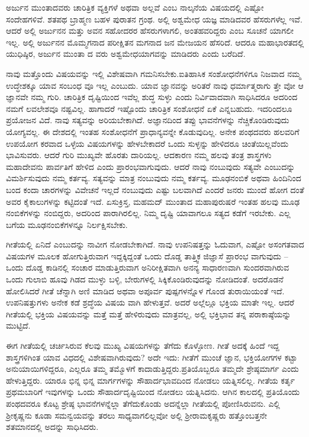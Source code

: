 ಅರ್ಜುನ ಮುಂತಾದವರು ಚಾರಿತ್ರಿಕ ವ್ಯಕ್ತಿಗಳೆ ಅಥವಾ ಅಲ್ಲವೆ ಎಂಬ ನಾಲ್ಕನೆಯ ವಿಷಯದಲ್ಲಿ ಎಷ್ಟೋ ಸಂದೇಹಗಳಿವೆ. ಶತಪಥ ಬ್ರಾಹ್ಮಣ ಬಹಳ ಪುರಾತನ ಗ್ರಂಥ. ಅಲ್ಲಿ ಅಶ್ವಮೇಧ ಯಜ್ಞ ಮಾಡಿದವರ ಹೆಸರುಗಳೆಲ್ಲ ಇವೆ. ಆದರೆ ಅಲ್ಲಿ ಅರ್ಜುನನ ಮತ್ತು ಅವನ ಸಹೋದರರ ಹೆಸರುಗಳಾಗಲಿ, ಅಂತಹವರಿದ್ದರು ಎಂಬ ಸೂಚನೆ ಯಾಗಲೀ ಇಲ್ಲ. ಅಲ್ಲಿ ಅರ್ಜುನನ ಮೊಮ್ಮಗನಾದ ಪರೀಕ್ಷಿತನ ಮಗನಾದ ಜನ ಮೇಜಯನ ಹೆಸರಿದೆ. ಆದರೂ ಮಹಾಭಾರತದಲ್ಲಿ ಯುಧಿಷ್ಠಿರ, ಅರ್ಜುನ ಮುಂತಾ ದ ವರು ಅಶ್ವಮೇಧಯಾಗವನ್ನು ಮಾಡಿದರು ಎಂದು ಬರೆದಿದೆ.

ನಾವು ಮತ್ತೊಂದು ವಿಷಯವನ್ನು ಇಲ್ಲಿ ವಿಶೇಷವಾಗಿ ಗಮನಿಸಬೇಕು.ಐತಿಹಾಸಿಕ ಸಂಶೋಧನೆಗಳಿಗೂ ನಿಜವಾದ ನಮ್ಮ ಉದ್ಧೇಶಕ್ಕೂ ಯಾವ ಸಂಬಂಧ ವೂ ಇಲ್ಲ ಎಂಬುದು. ಯಾವ ಜ್ಞಾನವನ್ನು ಅರಿತರೆ ನಾವು ಧರ್ಮಾತ್ಮರಾಗು ತ್ತೇ ವೋ ಆ ಜ್ಞಾನವೇ ನಮ್ಮ ಗುರಿ. ಚಾರಿತ್ರಿಕ ದೃಷ್ಟಿಯಿಂದ ಇವೆಲ್ಲ ಶುದ್ಧ ಸುಳ್ಳು ಎಂದು ನಿರ್ವಿವಾದವಾಗಿ ಸಾಧಿಸಿದರೂ ಅದರಿಂದ ನಮಗೆ ಲವಲೇಶವೂ ನಷ್ಟವಿಲ್ಲ. ಹಾಗಾದರೆ ಇಷ್ಟೊಂದು ಚಾರಿತ್ರಿಕ ಸಂಶೋಧನೆ ಏಕೆ ಎನ್ನಬಹುದು. ಇದರಿಂದಲೂ ಪ್ರಯೋಜನ ವಿದೆ. ನಾವು ಸತ್ಯವನ್ನು ಅರಿಯಬೇಕಾಗಿದೆ. ಅಜ್ಞಾನದಿಂದ ತಪ್ಪು ಭಾವನೆಗಳನ್ನು ನೆಚ್ಚಿಕೊಂಡಿರುವುದು ಯೋಗ್ಯವಲ್ಲ. ಈ ದೇಶದಲ್ಲಿ ಇಂತಹ ಸಂಶೋಧನೆಗೆ ಪ್ರಾಧಾನ್ಯವನ್ನೇ ಕೊಡುವುದಿಲ್ಲ. ಅನೇಕ ಪಂಥದವರು ಹಲವರಿಗೆ ಉಪಯೋಗ ಕರವಾದ ಒಳ್ಳೆಯ ವಿಷಯಗಳನ್ನು ಹೇಳಬೇಕಾದರೆ ಒಂದು ಸುಳ್ಳನ್ನು ಹೇಳಿದರೂ ಚಿಂತೆಯಿಲ್ಲವೆಂದು ಭಾವಿಸುವರು. ಆದರೆ ಗುರಿ ಮುಖ್ಯವೇ ಹೊರತು ದಾರಿಯಲ್ಲ. ಆದಕಾರಣ ನಮ್ಮ ಹಲವು ತಂತ್ರ ಶಾಸ್ತ್ರಗಳು ಮಹಾದೇವನು ಪಾರ್ವತಿಗೆ ಹೇಳಿದ ಎಂದು ಪ್ರಾರಂಭವಾಗುವುದು. ಆದರೆ ನಾವು ನಂಬುವುದು ಸತ್ಯವೇ ಎಂಬುದನ್ನು ವಿಮರ್ಶಿಸುವುದು ನಮ್ಮ ಕರ್ತವ್ಯ. ಸತ್ಯವನ್ನು ಮಾತ್ರ ನಂಬುವುದು ನಮ್ಮ ಕರ್ತವ್ಯ. ಮೂಢನಂಬಿಕೆ ಅಥವಾ ಹಿಂದಿನಿಂದ ಬಂದ ಕಂದಾ ಚಾರಗಳನ್ನು ವಿವೇಚನೆ ಇಲ್ಲದೆ ನಂಬುವುದು ಎಷ್ಟು ಬಲವಾಗಿದೆ ಎಂದರೆ ಜನರು ಮುಂದೆ ಹೋಗ ದಂತೆ ಅವರ ಕೈಕಾಲುಗಳನ್ನು ಕಟ್ಟಿದಂತೆ ಇದೆ. ಏಸುಕ್ರಿಸ್ತ, ಮಹಮದ್​ ಮುಂತಾದ ಮಹಾಪುರುಷರೆ ಇಂತಹ ಹಲವು ಮೂಢ ನಂಬಿಕೆಗಳನ್ನು ನಂಬಿದ್ದರು, ಅದರಿಂದ ಪಾರಾಗಿರಲಿಲ್ಲ. ನಿಮ್ಮ ದೃಷ್ಟಿ ಯಾವಾಗಲೂ ಸತ್ಯದ ಕಡೆಗೆ ಇರಬೇಕು. ಎಲ್ಲ ಬಗೆಯ ಮೂಢನಂಬಿಕೆಗಳನ್ನೂ ನಿರ್ಲಕ್ಷಿಸಬೇಕು.

ಗೀತೆಯಲ್ಲಿ ಏನಿದೆ ಎಂಬುದನ್ನು ನಾವೀಗ ನೋಡಬೇಕಾಗಿದೆ. ನಾವು ಉಪನಿಷತ್ತನ್ನು ಓದುವಾಗ, ಎಷ್ಟೋ ಅಸಂಗತವಾದ ವಿಷಯಗಳ ಮೂಲಕ ಹೋಗುತ್ತಿರುವಾಗ ಇದ್ದಕ್ಕಿದ್ದಂತೆ ಒಂದು ದೊಡ್ಡ ತಾತ್ತ್ವಿಕ ಜಿಜ್ಞಾಸೆ ಪ್ರಾರಂಭ ವಾಗುವುದು – ಒಂದು ದೊಡ್ಡ ಕಾಡಿನಲ್ಲಿ ಸಂಚಾರ ಮಾಡುತ್ತಿರುವಾಗ ಅನಿರೀಕ್ಷಿತವಾಗಿ ಅನನ್ಯ ಸಾಧಾರಣವಾಗಿ ಸುಂದರವಾಗಿರುವ ಒಂದು ಗುಲಾಬಿ ಹೂವು ಗಿಡದ ಮುಳ್ಳು ಬಳ್ಳಿ, ಬೇರುಗಳಲ್ಲಿ ಸಿಕ್ಕಿಕೊಂಡಿರುವುದನ್ನು ನೋಡಿದಂತೆ. ಅದರೊಡನೆ ಹೋಲಿಸಿದರೆ ಗೀತೆ ಚೆನ್ನಾಗಿ ಅಣಿ ಮಾಡಿದ ಅಥವಾ ಅಪೂರ್ವ ಪುಷ್ಪಗಳನ್ನೊಳ ಗೊಂಡ ತುರಾಯಿಯಂತೆ ಇದೆ. ಉಪನಿಷತ್ತುಗಳು ಅನೇಕ ಕಡೆ ಶ್ರದ್ಧೆಯ ವಿಷಯ ವಾಗಿ ಹೇಳುತ್ತವೆ. ಅದರೆ ಅಲ್ಲೆಲ್ಲೂ ಭಕ್ತಿಯ ಮಾತೇ ಇಲ್ಲ. ಆದರೆ ಗೀತೆಯಲ್ಲಿ ಭಕ್ತಿಯ ವಿಷಯವನ್ನು ಮತ್ತೆ ಮತ್ತೆ ಹೇಳಿರುವುದು ಮಾತ್ರವಲ್ಲ, ಅಲ್ಲಿ ಭಕ್ತಿಭಾವ ತನ್ನ ಪರಾಕಾಷ್ಠೆಯನ್ನು ಮುಟ್ಟಿದೆ.

ಈಗ ಗೀತೆಯಲ್ಲಿ ಚರ್ಚಿಸಿರುವ ಕೆಲವು ಮುಖ್ಯ ವಿಷಯಗಳನ್ನು ತೆಗೆದು ಕೊಳ್ಳೋಣ. ಗೀತೆ ಅದಕ್ಕೆ ಹಿಂದೆ ಇದ್ದ ಶಾಸ್ತ್ರಗಳಿಗಿಂತ ಯಾವ ವಿಧದಲ್ಲಿ ವಿಶೇಷವಾಗಿರುವುದು? ಅದೇ ಇದು: ಗೀತೆಗೆ ಮುಂಚೆ ಜ್ಞಾನ, ಭಕ್ತಿಯೋಗಗಳ ಕಟ್ಟಾ ಅನುಯಾಯಿಗಳಿದ್ದರೂ, ಎಲ್ಲರೂ ತಮ್ಮ ತಮ್ಮೊಳಗೆ ಕಾದಾಡುತ್ತಿದ್ದರು.ಪ್ರತಿಯೊಬ್ಬರೂ ತಮ್ಮದೇ ಶ್ರೇಷ್ಠಮಾರ್ಗ ಎಂದು ಹೇಳುತ್ತಿದ್ದರು. ಯಾರೂ ಭಿನ್ನ ಭಿನ್ನ ಮಾರ್ಗಗಳನ್ನು ಸೌಹಾರ್ದಭಾವದಿಂದ ನೋಡಲು ಯತ್ನಿಸಲಿಲ್ಲ. ಗೀತೆಯ ಕರ್ತೃ ಪ್ರಥಮಬಾರಿಗೆ ಇವುಗಳನ್ನು ಒಂದು ಸೌಹಾರ್ದದೃಷ್ಟಿಯಿಂದ ನೋಡಲು ಯತ್ನಿಸಿದನು. ಆಗಿನ ಕಾಲದಲ್ಲಿ ಪ್ರತಿಯೊಂದು ಪಂಥದವರೂ ಕೊಟ್ಟ ಶ್ರೇಷ್ಠ ಭಾವನೆಗಳನ್ನೆಲ್ಲಾ ತೆಗೆದುಕೊಂಡು ಅದನ್ನೆಲ್ಲಾ ಗೀತೆಯಲ್ಲಿ ಪೋಣಿಸಿರುವನು. ಎಲ್ಲಿ ಶ‍್ರೀಕೃಷ್ಣನು ಕೂಡಾ ಸಮನ್ವಯವನ್ನು ತರಲು ಸಾಧ್ಯವಾಗಲಿಲ್ಲವೋ ಅಲ್ಲಿ ಶ‍್ರೀರಾಮಕೃಷ್ಣರು ಹತ್ತೊಂಬತ್ತನೇ ಶತಮಾನದಲ್ಲಿ ಅದನ್ನು ಸಾಧಿಸಿದರು.

